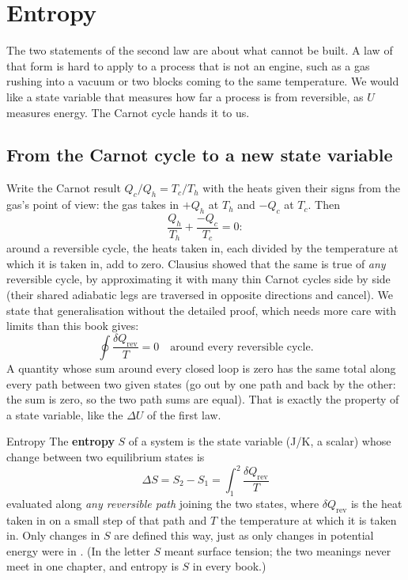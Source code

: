 \section{Entropy}\label{sec:entropy}


The two statements of the second law are about what cannot be built. A law of that form is hard to apply
to a process that is not an engine, such as a gas rushing into a vacuum or two blocks coming to the same
temperature. We would like a state variable that measures how far a process is from reversible, as $U$
measures energy. The Carnot cycle hands it to us.

\subsection{From the Carnot cycle to a new state variable}

Write the Carnot result $Q_c/Q_h=T_c/T_h$ with the heats given their signs from the gas's point of view:
the gas takes in $+Q_h$ at $T_h$ and $-Q_c$ at $T_c$. Then
\[
\frac{Q_h}{T_h}+\frac{-Q_c}{T_c}=0 :
\]
around a reversible cycle, the heats taken in, each divided by the temperature at which it is taken in,
add to zero. Clausius showed that the same is true of \emph{any} reversible cycle, by approximating it
with many thin Carnot cycles side by side (their shared adiabatic legs are traversed in opposite
directions and cancel). We state that generalisation without the detailed proof, which needs more care
with limits than this book gives:
\[
\oint\frac{\delta Q_{\text{rev}}}{T}=0\quad\text{around every reversible cycle.}
\]
A quantity whose sum around every closed loop is zero has the same total along every path between two
given states (go out by one path and back by the other: the sum is zero, so the two path sums are equal).
That is exactly the property of a state variable, like the $\Delta U$ of the first law.

\begin{defbox}{Entropy}
The \textbf{entropy} $S$ of a system is the state variable (\si{J/K}, a scalar) whose change between two
equilibrium states is
\[
\boxed{\;\Delta S=S_2-S_1=\int_1^2\frac{\delta Q_{\text{rev}}}{T}\;}
\]
evaluated along \emph{any reversible path} joining the two states, where $\delta Q_{\text{rev}}$ is the heat
taken in on a small step of that path and $T$ the temperature at which it is taken in. Only changes in $S$
are defined this way, just as only changes in potential energy were in . (In  the letter $S$ meant surface tension; the two meanings never meet in one chapter, and entropy is $S$ in every book.)
\end{defbox}

